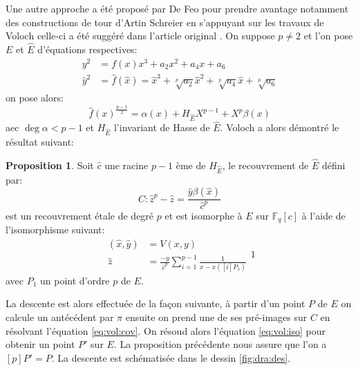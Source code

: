 \documentclass[10pt,a4paper]{book}
\theoremstyle{plain}
\theoremstyle{definition}
\theoremstyle{definition}
\theoremstyle{definition}
\newtheorem{prop}[thm]{Proposition}
\theoremstyle{definition}
\theoremstyle{remark}
\theoremstyle{remark}
\theoremstyle{definition}
\begin{document}
Une autre approche a été proposé par De Feo pour prendre avantage notamment des constructions de tour d'Artin Schreier en s'appuyant sur les travaux de Voloch \cite{Voloch90} celle-ci a été suggéré dans l'article original \cite{Couveignes96}. On suppose $p\neq 2$ et l'on pose $E$ et $\widehat{E}$ d'équations respectives:
\begin{equation}
\begin{alignedat}{1}
y^2 &= f(x)x^3+a_2x^2+a_4x+a_6 \\
\widehat{y}^2 &= \widehat{f}(\widehat{x})=\widehat{x}^3+\sqrt[p]{a_2}\widehat{x}^2+\sqrt[p]{a_4}\widehat{x}+\sqrt[p]{a_6}
\end{alignedat}
\end{equation}
on pose alors:
\begin{equation}
\widehat{f}(x)^{\frac{p-1}{2}}=\alpha(x)+H_{\widehat{E}}X^{p-1}+X^{p}\beta(x)
\end{equation}
aec $\deg  \alpha <p-1$ et $H_{\widehat{E}}$ l'invariant de Hasse de $\widehat{E}$. Voloch a alors démontré le résultat suivant:
\begin{prop}
Soit $\widehat{c}$ une racine $p-1$ ème de $H_{\widehat{E}}$, le recouvrement de $\widehat{E}$ défini par:
\begin{equation}
\label{eq:vol:cov}
C:\widehat{z}^p-\widehat{z}=\frac{\widehat{y}\beta( \widehat{x})}{\widehat{c}^p}
\end{equation}
est un recouvrement étale de degré $p$ et est isomorphe à $E$ sur $\mathbb{F}_q[c]$ à l'aide de l'isomorphisme suivant:
\begin{equation}
\label{eq:vol:iso}
\begin{alignedat}{1}
(\widehat{x},\widehat{y}) &= V(x,y) \\
\widehat{z} &= \frac{-y}{\widehat{c}^p}\sum_{i=1}^{p-1}\frac{1}{x-x([i]P_1)}
\end{alignedat}{1}
\end{equation}
avec $P_1$ un point d'ordre $p$ de $E$.
\end{prop}

La descente est alors effectuée de la façon suivante, à partir d'un point $P$ de $E$ on calcule un antécédent par $\pi$ ensuite on prend une de ses pré-images sur $C$ en résolvant l'équation \eqref{eq:vol:cov}. On résoud alors l'équation \eqref{eq:vol:iso} pour obtenir un point $P'$ sur $E$. La proposition précédente nous assure que l'on a $[p]P'=P$. La descente est schématisée dans le dessin \ref{fig:dra:des}.
\end{document}
